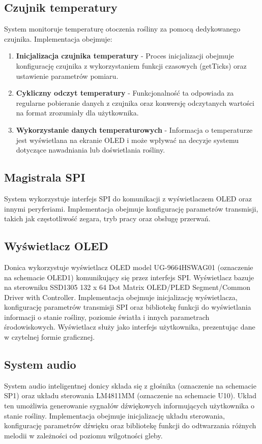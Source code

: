 \documentclass{article}
\begin{document}
\subsection{Czujnik temperatury}
System monitoruje temperaturę otoczenia rośliny za pomocą dedykowanego czujnika. Implementacja obejmuje:

\begin{enumerate}
    \item \textbf{Inicjalizacja czujnika temperatury} - Proces inicjalizacji obejmuje konfigurację czujnika z wykorzystaniem funkcji czasowych (getTicks) oraz ustawienie parametrów pomiaru.
    
    \item \textbf{Cykliczny odczyt temperatury} - Funkcjonalność ta odpowiada za regularne pobieranie danych z czujnika oraz konwersję odczytanych wartości na format zrozumiały dla użytkownika.
    
    \item \textbf{Wykorzystanie danych temperaturowych} - Informacja o temperaturze jest wyświetlana na ekranie OLED i może wpływać na decyzje systemu dotyczące nawadniania lub doświetlania rośliny.
\end{enumerate}

\subsection{Magistrala SPI}
System wykorzystuje interfejs SPI do komunikacji z wyświetlaczem OLED oraz innymi peryferiami. Implementacja obejmuje konfigurację parametrów transmisji, takich jak częstotliwość zegara, tryb pracy oraz obsługę przerwań.

\subsection{Wyświetlacz OLED}
Donica wykorzystuje wyświetlacz OLED model UG-9664HSWAG01 (oznaczenie na schemacie OLED1) komunikujący się przez interfejs SPI. Wyświetlacz bazuje na sterowniku SSD1305 132 x 64 Dot Matrix OLED/PLED Segment/Common Driver with Controller. Implementacja obejmuje inicjalizację wyświetlacza, konfigurację parametrów transmisji SPI oraz bibliotekę funkcji do wyświetlania informacji o stanie rośliny, poziomie światła i innych parametrach środowiskowych. Wyświetlacz służy jako interfejs użytkownika, prezentując dane w czytelnej formie graficznej.

\subsection{System audio}
System audio inteligentnej donicy składa się z głośnika (oznaczenie na schemacie SP1) oraz układu sterowania LM4811MM (oznaczenie na schemacie U10). Układ ten umożliwia generowanie sygnałów dźwiękowych informujących użytkownika o stanie rośliny. Implementacja obejmuje inicjalizację układu sterowania, konfigurację parametrów dźwięku oraz bibliotekę funkcji do odtwarzania różnych melodii w zależności od poziomu wilgotności gleby.
\end{document}
